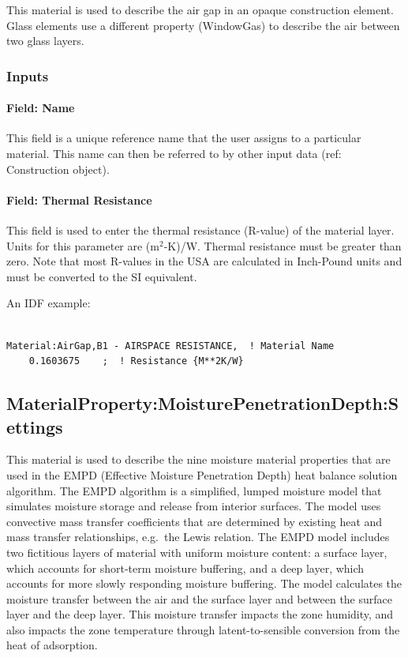 This material is used to describe the air gap in an opaque construction element. Glass elements use a different property (WindowGas) to describe the air between two glass layers.

\subsubsection{Inputs}\label{inputs-3-036}

\paragraph{Field: Name}\label{field-name-3-031}

This field is a unique reference name that the user assigns to a particular material. This name can then be referred to by other input data (ref: Construction object).

\paragraph{Field: Thermal Resistance}\label{field-thermal-resistance-1}

This field is used to enter the thermal resistance (R-value) of the material layer. Units for this parameter are (m\(^{2}\)-K)/W. Thermal resistance must be greater than zero. Note that most R-values in the USA are calculated in Inch-Pound units and must be converted to the SI equivalent.

An IDF example:

\begin{lstlisting}

Material:AirGap,B1 - AIRSPACE RESISTANCE,  ! Material Name
    0.1603675    ;  ! Resistance {M**2K/W}
\end{lstlisting}

\subsection{MaterialProperty:MoisturePenetrationDepth:Settings}\label{materialpropertymoisturepenetrationdepthsettings}

This material is used to describe the nine moisture material properties
that are used in the EMPD (Effective Moisture Penetration Depth) heat
balance solution algorithm. The EMPD algorithm is a simplified, lumped
moisture model that simulates moisture storage and release from interior
surfaces. The model uses convective mass transfer
coefficients that are determined by existing heat and mass transfer
relationships, e.g.~the Lewis relation. The EMPD model includes two
fictitious layers of material with uniform moisture content: a surface
layer, which accounts for short-term moisture buffering, and a deep
layer, which accounts for more slowly responding moisture buffering. The
model calculates the moisture transfer between the air and the surface
layer and between the surface layer and the deep layer. This moisture
transfer impacts the zone humidity, and also impacts the zone
temperature through latent-to-sensible conversion from the heat of
adsorption.

